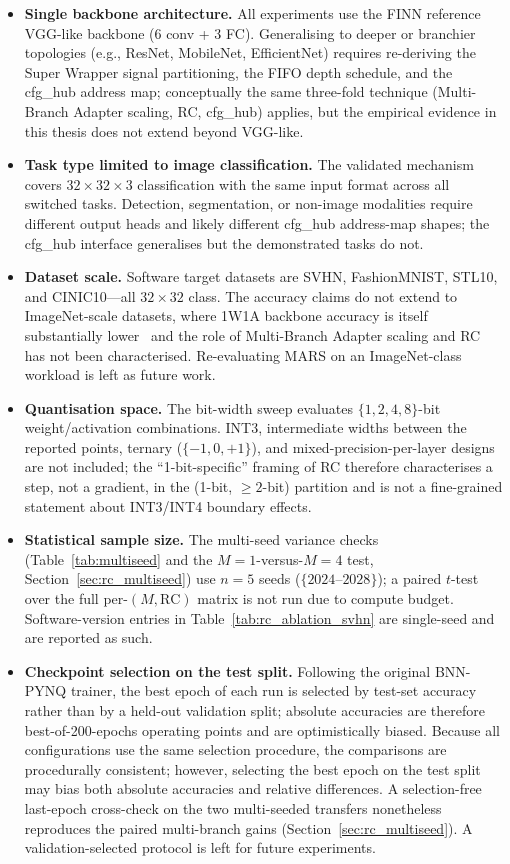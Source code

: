 \documentclass[12pt, a4paper]{report}
\numberwithin{equation}{chapter}
\numberwithin{figure}{chapter}
\numberwithin{table}{chapter}
\numberwithin{algorithm}{chapter}
\begin{document}
\begin{itemize}
    \item \textbf{Single backbone architecture.} All experiments use the FINN reference VGG-like backbone (6 conv + 3 FC). Generalising to deeper or branchier topologies (e.g., ResNet, MobileNet, EfficientNet) requires re-deriving the Super Wrapper signal partitioning, the FIFO depth schedule, and the cfg\_hub address map; conceptually the same three-fold technique (Multi-Branch Adapter scaling, RC, cfg\_hub) applies, but the empirical evidence in this thesis does not extend beyond VGG-like.
    \item \textbf{Task type limited to image classification.} The validated mechanism covers $32{\times}32{\times}3$ classification with the same input format across all switched tasks. Detection, segmentation, or non-image modalities require different output heads and likely different cfg\_hub address-map shapes; the cfg\_hub interface generalises but the demonstrated tasks do not.
    \item \textbf{Dataset scale.} Software target datasets are SVHN, FashionMNIST, STL10, and CINIC10---all $32{\times}32$ class. The accuracy claims do not extend to ImageNet-scale datasets, where 1W1A backbone accuracy is itself substantially lower~\cite{Rastegari2016XNOR} and the role of Multi-Branch Adapter scaling and RC has not been characterised. Re-evaluating MARS on an ImageNet-class workload is left as future work.
    \item \textbf{Quantisation space.} The bit-width sweep evaluates $\{1, 2, 4, 8\}$-bit weight/activation combinations. INT3, intermediate widths between the reported points, ternary ($\{-1, 0, +1\}$), and mixed-precision-per-layer designs are not included; the ``1-bit-specific'' framing of RC therefore characterises a step, not a gradient, in the (1-bit, $\geq 2$-bit) partition and is not a fine-grained statement about INT3/INT4 boundary effects.
    \item \textbf{Statistical sample size.} The multi-seed variance checks (Table~\ref{tab:multiseed} and the $M{=}1$-versus-$M{=}4$ test, Section~\ref{sec:rc_multiseed}) use $n=5$ seeds ($\{2024\text{--}2028\}$); a paired $t$-test over the full per-$(M, \text{RC})$ matrix is not run due to compute budget. Software-version entries in Table~\ref{tab:rc_ablation_svhn} are single-seed and are reported as such.
    \item \textbf{Checkpoint selection on the test split.} Following the original BNN-PYNQ trainer, the best epoch of each run is selected by test-set accuracy rather than by a held-out validation split; absolute accuracies are therefore best-of-200-epochs operating points and are optimistically biased. Because all configurations use the same selection procedure, the comparisons are procedurally consistent; however, selecting the best epoch on the test split may bias both absolute accuracies and relative differences. A selection-free last-epoch cross-check on the two multi-seeded transfers nonetheless reproduces the paired multi-branch gains (Section~\ref{sec:rc_multiseed}). A validation-selected protocol is left for future experiments.

\end{itemize}
\end{document}
